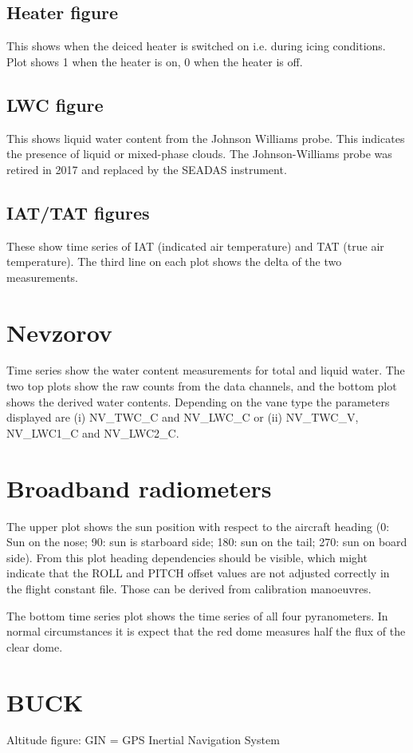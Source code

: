 \subsection*{Heater figure}
This shows when the deiced heater is switched on i.e. during icing conditions. Plot shows 1 when the heater is on, 0 when the heater is off. 

\subsection*{LWC figure}
This shows liquid water content from the Johnson Williams probe. This indicates the presence of liquid or mixed-phase clouds. The Johnson-Williams probe was retired in 2017 and replaced by the SEADAS instrument.

\subsection*{IAT/TAT figures}
These show time series of IAT (indicated air temperature) and TAT (true air temperature). The third line on each plot shows the delta of the two measurements.

\section*{Nevzorov}
Time series show the water content measurements for total and liquid water. The two top plots show the raw counts from the data channels, and the bottom plot shows the derived water contents. Depending on the vane type the parameters displayed are (i) NV_TWC_C and NV_LWC_C or (ii) NV_TWC_V, NV_LWC1_C and NV_LWC2_C. 

\section*{Broadband radiometers}
The upper plot shows the sun position with respect to the aircraft heading (0: Sun on the nose; 90: sun is starboard side; 180: sun on the tail; 270: sun on board side). From this plot heading dependencies should be visible, which might indicate that the ROLL and PITCH offset values are not adjusted correctly in the flight constant file. Those can be derived from calibration manoeuvres.

The bottom time series plot shows the time series of all four pyranometers. In normal circumstances it is expect that the red dome measures half the flux of the clear dome. 


\section*{BUCK}
Altitude figure:
GIN = GPS Inertial Navigation System


